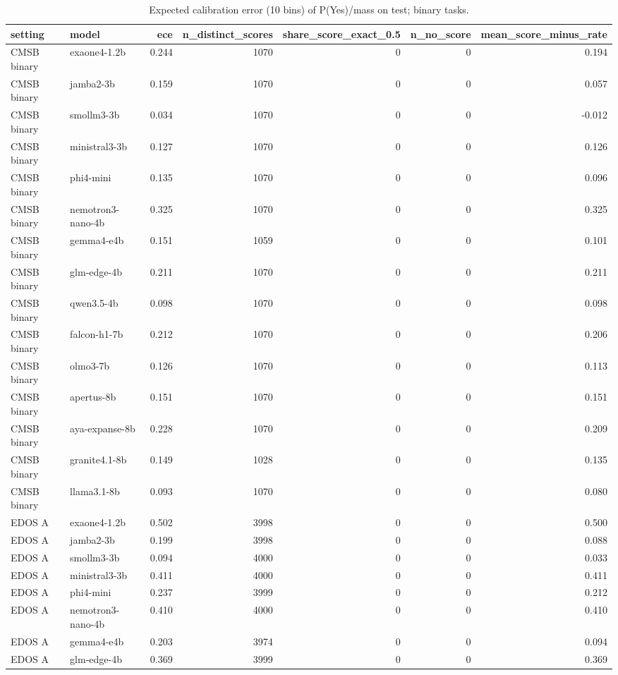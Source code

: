 \begin{table}[t]
\caption{Expected calibration error (10 bins) of P(Yes)/mass on test; binary tasks.}
\label{tab:calibration}
\begin{tabular}{llrrrrr}
\toprule
setting & model & ece & n_distinct_scores & share_score_exact_0.5 & n_no_score & mean_score_minus_rate \\
\midrule
CMSB binary & exaone4-1.2b & 0.244 & 1070 & 0 & 0 & 0.194 \\
CMSB binary & jamba2-3b & 0.159 & 1070 & 0 & 0 & 0.057 \\
CMSB binary & smollm3-3b & 0.034 & 1070 & 0 & 0 & -0.012 \\
CMSB binary & ministral3-3b & 0.127 & 1070 & 0 & 0 & 0.126 \\
CMSB binary & phi4-mini & 0.135 & 1070 & 0 & 0 & 0.096 \\
CMSB binary & nemotron3-nano-4b & 0.325 & 1070 & 0 & 0 & 0.325 \\
CMSB binary & gemma4-e4b & 0.151 & 1059 & 0 & 0 & 0.101 \\
CMSB binary & glm-edge-4b & 0.211 & 1070 & 0 & 0 & 0.211 \\
CMSB binary & qwen3.5-4b & 0.098 & 1070 & 0 & 0 & 0.098 \\
CMSB binary & falcon-h1-7b & 0.212 & 1070 & 0 & 0 & 0.206 \\
CMSB binary & olmo3-7b & 0.126 & 1070 & 0 & 0 & 0.113 \\
CMSB binary & apertus-8b & 0.151 & 1070 & 0 & 0 & 0.151 \\
CMSB binary & aya-expanse-8b & 0.228 & 1070 & 0 & 0 & 0.209 \\
CMSB binary & granite4.1-8b & 0.149 & 1028 & 0 & 0 & 0.135 \\
CMSB binary & llama3.1-8b & 0.093 & 1070 & 0 & 0 & 0.080 \\
EDOS A & exaone4-1.2b & 0.502 & 3998 & 0 & 0 & 0.500 \\
EDOS A & jamba2-3b & 0.199 & 3998 & 0 & 0 & 0.088 \\
EDOS A & smollm3-3b & 0.094 & 4000 & 0 & 0 & 0.033 \\
EDOS A & ministral3-3b & 0.411 & 4000 & 0 & 0 & 0.411 \\
EDOS A & phi4-mini & 0.237 & 3999 & 0 & 0 & 0.212 \\
EDOS A & nemotron3-nano-4b & 0.410 & 4000 & 0 & 0 & 0.410 \\
EDOS A & gemma4-e4b & 0.203 & 3974 & 0 & 0 & 0.094 \\
EDOS A & glm-edge-4b & 0.369 & 3999 & 0 & 0 & 0.369 \\

\end{tabular}
\end{table}
